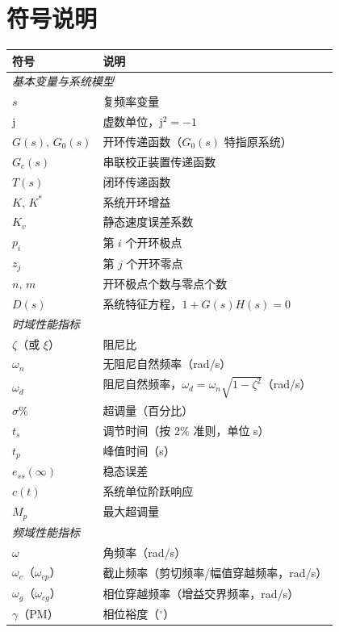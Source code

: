 \documentclass[a4paper]{ctexbook}
\begin{document}
\chapter{符号说明}

\begin{table}[htbp]
\centering
\renewcommand{\arraystretch}{1.35}
\begin{tabular}{p{3.2cm}p{10cm}}
\toprule
\textbf{符号} & \textbf{说明} \\
\midrule
\multicolumn{2}{l}{\textit{基本变量与系统模型}} \\
$s$ & 复频率变量 \\
$\mathrm{j}$ & 虚数单位，$\mathrm{j}^2=-1$ \\
$G(s),\,G_0(s)$ & 开环传递函数（$G_0(s)$ 特指原系统） \\
$G_c(s)$ & 串联校正装置传递函数 \\
$T(s)$ & 闭环传递函数 \\
$K,\,K^*$ & 系统开环增益 \\
$K_v$ & 静态速度误差系数 \\
$p_i$ & 第 $i$ 个开环极点 \\
$z_j$ & 第 $j$ 个开环零点 \\
$n,\,m$ & 开环极点个数与零点个数 \\
$D(s)$ & 系统特征方程，$1+G(s)H(s)=0$ \\
\midrule
\multicolumn{2}{l}{\textit{时域性能指标}} \\
$\zeta$（或 $\xi$） & 阻尼比 \\
$\omega_n$ & 无阻尼自然频率（rad/s） \\
$\omega_d$ & 阻尼自然频率，$\omega_d=\omega_n\sqrt{1-\zeta^2}$（rad/s） \\
$\sigma\%$ & 超调量（百分比） \\
$t_s$ & 调节时间（按 $2\%$ 准则，单位 s） \\
$t_p$ & 峰值时间（s） \\
$e_{ss}(\infty)$ & 稳态误差 \\
$c(t)$ & 系统单位阶跃响应 \\
$M_p$ & 最大超调量 \\
\midrule
\multicolumn{2}{l}{\textit{频域性能指标}} \\
$\omega$ & 角频率（rad/s） \\
$\omega_c$（$\omega_{cp}$） & 截止频率（剪切频率/幅值穿越频率，rad/s） \\
$\omega_g$（$\omega_{cg}$） & 相位穿越频率（增益交界频率，rad/s） \\
$\gamma$（PM） & 相位裕度（$^\circ$） \\

\end{tabular}
\end{table}
\end{document}
